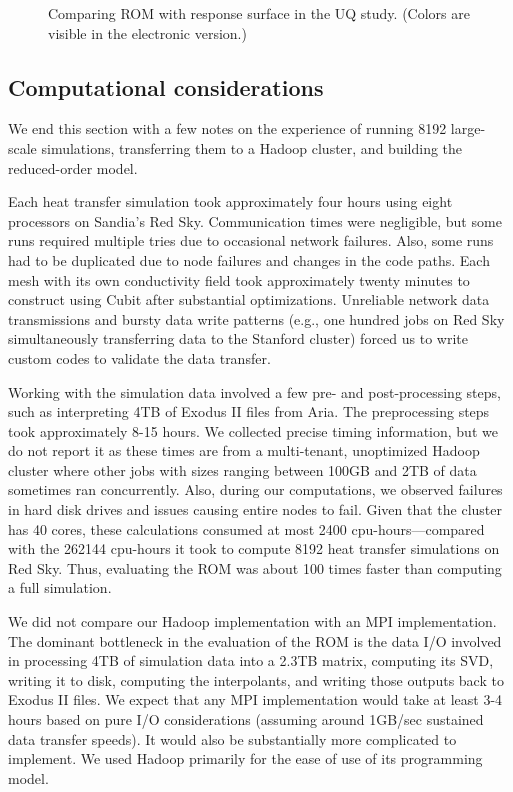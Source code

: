 \documentclass[final]{siamltex}
\begin{document}
\begin{figure}[t]
\centering
{}\;
\caption{Comparing ROM with response surface in the UQ study. (Colors are
  visible in the electronic version.) }
\label{fig:rscompare}
\end{figure} 

\subsection{Computational considerations}
We end this section with a few notes on the experience of running 8192
large-scale simulations, transferring them to a Hadoop cluster, and
building the reduced-order model.

Each heat transfer simulation took approximately four hours using
eight processors on Sandia's Red Sky. Communication times were
negligible, but some runs required multiple tries due to occasional
network failures. Also, some runs had to be duplicated due to node
failures and changes in the code paths. Each mesh with its own
conductivity field took approximately twenty minutes to construct
using Cubit after substantial optimizations. 
Unreliable network data transmissions and bursty data write patterns
(e.g., one hundred jobs on Red Sky simultaneously transferring data to
the Stanford cluster) forced us to write custom codes to validate the
data transfer.

Working with the simulation data involved a few pre- and
post-processing steps, such as interpreting 4TB of Exodus II files
from Aria. The preprocessing steps took approximately 8-15 hours. We
collected precise timing information, but we do not report it as these
times are from a multi-tenant, unoptimized Hadoop cluster where other
jobs with sizes ranging between 100GB and 2TB of data sometimes ran
concurrently. Also, during our computations, we observed failures in
hard disk drives and issues causing entire nodes to fail. Given that
the cluster has 40 cores, these calculations consumed at most
2400 cpu-hours---compared with the 262144 cpu-hours it took to
compute 8192 heat transfer simulations on Red Sky. Thus, evaluating
the ROM was about 100 times faster than computing a full simulation.

We did not compare our Hadoop implementation with an MPI
implementation. The dominant bottleneck in the evaluation of the ROM
is the data I/O involved in processing 4TB of simulation data into a
2.3TB matrix, computing its SVD, writing it to disk, computing the
interpolants, and writing those outputs back to Exodus II files. We
expect that any MPI implementation would take at least 3-4 hours based
on pure I/O considerations (assuming around 1GB/sec sustained data
transfer speeds).  It would also be substantially more complicated to
implement. We used Hadoop primarily for the ease of use of its
programming model.
\end{document}
